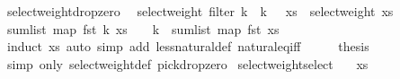 \begin{isabellebody}
\endisatagproof
{\isafoldproof}%
%
\isadelimproof
\isanewline
%
\endisadelimproof
\isanewline
{}\isamarkupfalse%
\ select{\isacharunderscore}{\kern0pt}weight{\isacharunderscore}{\kern0pt}drop{\isacharunderscore}{\kern0pt}zero{\isacharcolon}{\kern0pt}\isanewline
\ \ {\isachardoublequoteopen}select{\isacharunderscore}{\kern0pt}weight\ {\isacharparenleft}{\kern0pt}filter\ {\isacharparenleft}{\kern0pt}{\isasymlambda}{\isacharparenleft}{\kern0pt}k{\isacharcomma}{\kern0pt}\ {\isacharunderscore}{\kern0pt}{\isacharparenright}{\kern0pt}{\isachardot}{\kern0pt}\ k\ {\isachargreater}{\kern0pt}\ {}{\isacharparenright}{\kern0pt}\ xs{\isacharparenright}{\kern0pt}\ {\isacharequal}{\kern0pt}\ select{\isacharunderscore}{\kern0pt}weight\ xs{\isachardoublequoteclose}\isanewline
%
\isadelimproof
%
\endisadelimproof
%
\isatagproof
{}\isamarkupfalse%
\ {\isacharminus}{\kern0pt}\isanewline
\ \ \isamarkupfalse%
\ {\isachardoublequoteopen}sum{\isacharunderscore}{\kern0pt}list\ {\isacharparenleft}{\kern0pt}map\ fst\ {\isacharbrackleft}{\kern0pt}{\isacharparenleft}{\kern0pt}k{\isacharcomma}{\kern0pt}\ {\isacharunderscore}{\kern0pt}{\isacharparenright}{\kern0pt}{\isasymleftarrow}xs\ {\isachardot}{\kern0pt}\ {}\ {\isacharless}{\kern0pt}\ k{\isacharbrackright}{\kern0pt}{\isacharparenright}{\kern0pt}\ {\isacharequal}{\kern0pt}\ sum{\isacharunderscore}{\kern0pt}list\ {\isacharparenleft}{\kern0pt}map\ fst\ xs{\isacharparenright}{\kern0pt}{\isachardoublequoteclose}\isanewline
\ \ \ \ \isamarkupfalse%
\ {\isacharparenleft}{\kern0pt}induct\ xs{\isacharparenright}{\kern0pt}\ {\isacharparenleft}{\kern0pt}auto\ simp\ add{\isacharcolon}{\kern0pt}\ less{\isacharunderscore}{\kern0pt}natural{\isacharunderscore}{\kern0pt}def\ natural{\isacharunderscore}{\kern0pt}eq{\isacharunderscore}{\kern0pt}iff{\isacharparenright}{\kern0pt}\isanewline
\ \ \isamarkupfalse%
\ \isamarkupfalse%
\ {\isacharquery}{\kern0pt}thesis\ \isamarkupfalse%
\ {\isacharparenleft}{\kern0pt}simp\ only{\isacharcolon}{\kern0pt}\ select{\isacharunderscore}{\kern0pt}weight{\isacharunderscore}{\kern0pt}def\ pick{\isacharunderscore}{\kern0pt}drop{\isacharunderscore}{\kern0pt}zero{\isacharparenright}{\kern0pt}\isanewline
{}\isamarkupfalse%
%
\endisatagproof
{\isafoldproof}%
%
\isadelimproof
\isanewline
%
\endisadelimproof
\isanewline
{}\isamarkupfalse%
\ select{\isacharunderscore}{\kern0pt}weight{\isacharunderscore}{\kern0pt}select{\isacharcolon}{\kern0pt}\isanewline
\ \ \ {\isachardoublequoteopen}xs\ {\isasymnoteq}\ {\isacharbrackleft}{\kern0pt}{\isacharbrackright}{\kern0pt}{\isachardoublequoteclose}\isanewline

\end{isabellebody}
